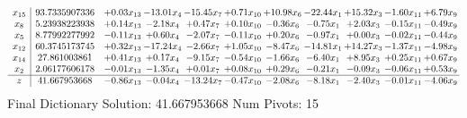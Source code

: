 \documentclass[9pt]{article}
\begin{document}
 \[\begin{array}{c| c c@{\hskip 2pt} c@{\hskip 2pt} c@{\hskip 2pt} c@{\hskip 2pt} c@{\hskip 2pt} c@{\hskip 2pt} c@{\hskip 2pt} c@{\hskip 2pt} c@{\hskip 2pt} }
 x_{15}   &  93.7335907336 & +  0.03 x_{13} & -13.01 x_{4} & -15.45 x_{7} & +  0.71 x_{10} & + 10.98 x_{6} & -22.44 x_{1} & + 15.32 x_{3} & -1.60 x_{11} & +  6.79 x_{9}\\
 x_{8}   &  5.23938223938 & +  0.14 x_{13} & -2.18 x_{4} & +  0.47 x_{7} & +  0.10 x_{10} & -0.36 x_{6} & -0.75 x_{1} & +  2.03 x_{3} & -0.15 x_{11} & -0.49 x_{9}\\
 x_{5}   &  8.77992277992 & -0.11 x_{13} & +  0.60 x_{4} & -2.07 x_{7} & -0.11 x_{10} & +  0.20 x_{6} & -0.97 x_{1} & +  0.00 x_{3} & -0.02 x_{11} & -0.44 x_{9}\\
 x_{12}   &  60.3745173745 & +  0.32 x_{13} & -17.24 x_{4} & -2.66 x_{7} & +  1.05 x_{10} & -8.47 x_{6} & -14.81 x_{1} & + 14.27 x_{3} & -1.37 x_{11} & -4.98 x_{9}\\
 x_{14}   &  27.861003861 & +  0.41 x_{13} & +  0.17 x_{4} & -9.15 x_{7} & -0.54 x_{10} & -1.66 x_{6} & -6.40 x_{1} & +  8.95 x_{3} & +  0.25 x_{11} & +  0.67 x_{9}\\
 x_{2}   &  2.06177606178 & -0.01 x_{13} & -1.35 x_{4} & +  0.01 x_{7} & +  0.08 x_{10} & +  0.29 x_{6} & -0.21 x_{1} & -0.09 x_{3} & -0.06 x_{11} & +  0.53 x_{9}\\
\hline
z    &  41.667953668 & -0.86 x_{13} & -0.04 x_{4} & -13.24 x_{7} & -0.47 x_{10} & -2.08 x_{6} & -8.18 x_{1} & -2.40 x_{3} & -0.01 x_{11} & -4.06 x_{9}\\
\end{array}\]
Final Dictionary
Solution:  41.667953668
Num Pivots:  15
\end{document}
